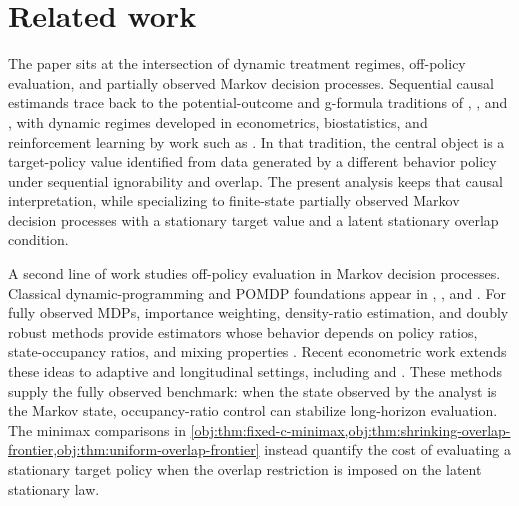 \section{Related work}

The paper sits at the intersection of dynamic treatment regimes, off-policy evaluation, and partially observed Markov decision processes. Sequential causal estimands trace back to the potential-outcome and g-formula traditions of \citet{Robins1986}, \citet{Rosenbaum1983}, and \citet{Robins2000}, with dynamic regimes developed in econometrics, biostatistics, and reinforcement learning by work such as \citet{Murphy2003}. In that tradition, the central object is a target-policy value identified from data generated by a different behavior policy under sequential ignorability and overlap. The present analysis keeps that causal interpretation, while specializing to finite-state partially observed Markov decision processes with a stationary target value and a latent stationary overlap condition.

A second line of work studies off-policy evaluation in Markov decision processes. Classical dynamic-programming and POMDP foundations appear in \citet{Smallwood1973}, \citet{Kaelbling1998}, and \citet{Sutton2018}. For fully observed MDPs, importance weighting, density-ratio estimation, and doubly robust methods provide estimators whose behavior depends on policy ratios, state-occupancy ratios, and mixing properties \citep{Precup2000,Jiang2016,Thomas2016,Liu2018,Nachum2019,Uehara2020,KallusUehara2020}. Recent econometric work extends these ideas to adaptive and longitudinal settings, including \citet{LiaoKlasnjaMurphy2021} and \citet{Liao2022}. These methods supply the fully observed benchmark: when the state observed by the analyst is the Markov state, occupancy-ratio control can stabilize long-horizon evaluation. The minimax comparisons in \cref{obj:thm:fixed-c-minimax,obj:thm:shrinking-overlap-frontier,obj:thm:uniform-overlap-frontier} instead quantify the cost of evaluating a stationary target policy when the overlap restriction is imposed on the latent stationary law.

